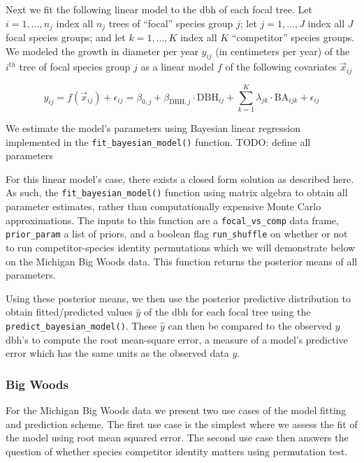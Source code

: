 \documentclass[12pt]{article}
\begin{document}
Next we fit the following linear model to the dbh of each focal tree.
Let \(i = 1, \ldots, n_j\) index all \(n_j\) trees of ``focal'' species
group \(j\); let \(j = 1, \ldots, J\) index all \(J\) focal species
groups; and let \(k = 1, \ldots, K\) index all \(K\) ``competitor''
species groups. We modeled the growth in diameter per year \(y_{ij}\)
(in centimeters per year) of the \(i^{th}\) tree of focal species group
\(j\) as a linear model \(f\) of the following covariates
\(\vec{x}_{ij}\)

\[
\newcommand{\dbh}{\text{DBH}}
\newcommand{\biomass}{\text{biomass}}
\newcommand{\BA}{\text{BA}}
y_{ij} = f(\vec{x}_{ij}) + \epsilon_{ij} = \beta_{0,j} + \beta_{\dbh,j} \cdot \dbh_{ij} + \sum_{k=1}^{K} \lambda_{jk} \cdot \BA_{ijk} + \epsilon_{ij}
\]

We estimate the model's parameters using Bayesian linear regression
implemented in the \texttt{fit\_bayesian\_model()} function. TODO:
define all parameters

For this linear model's case, there exists a closed form solution as
described here. As such, the \texttt{fit\_bayesian\_model()} function
using matrix algebra to obtain all parameter estimates, rather than
computationally expensive Monte Carlo approximations. The inputs to this
function are a \texttt{focal\_vs\_comp} data frame,
\texttt{prior\_param} a list of priors, and a boolean flag
\texttt{run\_shuffle} on whether or not to run competitor-species
identity permutations which we will demonstrate below on the Michigan
Big Woods data. This function returns the posterior means of all
parameters.

Using these posterior means, we then use the posterior predictive
distribution to obtain fitted/predicted values \(\widehat{y}\) of the
dbh for each focal tree using the \texttt{predict\_bayesian\_model()}.
These \(\widehat{y}\) can then be compared to the observed \(y\) dbh's
to compute the root mean-square error, a measure of a model's predictive
error which has the same units as the observed data \(y\).

\hypertarget{big-woods-4}{%
\subsubsection{Big Woods}\label{big-woods-4}}

For the Michigan Big Woods data we present two use cases of the model
fitting and prediction scheme. The first use case is the simplest where
we assess the fit of the model using root mean squared error. The second
use case then answers the question of whether species competitor
identity matters using permutation test.
\end{document}
